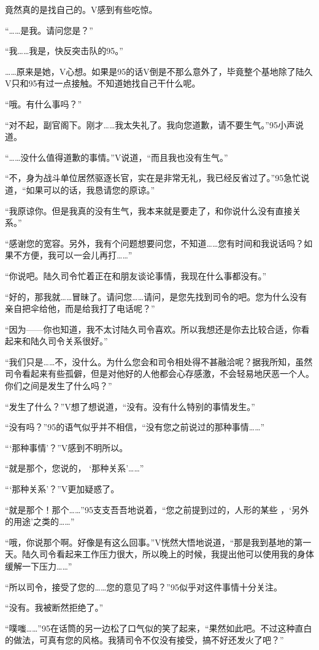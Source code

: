 竟然真的是找自己的。V感到有些吃惊。

“……是我。请问您是？”

“我……我是，快反突击队的95。”

……原来是她，V心想。如果是95的话V倒是不那么意外了，毕竟整个基地除了陆久V只和95有过一点接触。不知道她找自己干什么呢。

“哦。有什么事吗？”

“对不起，副官阁下。刚才……我太失礼了。我向您道歉，请不要生气。”95小声说道。

“……没什么值得道歉的事情。”V说道，“而且我也没有生气。”

“不，身为战斗单位居然驱逐长官，实在是非常无礼，我已经反省过了。”95急忙说道，“如果可以的话，我恳请您的原谅。”

“我原谅你。但是我真的没有生气，我本来就是要走了，和你说什么没有直接关系。”

“感谢您的宽容。另外，我有个问题想要问您，不知道……您有时间和我说话吗？如果不方便，我可以一会儿再打……”

“你说吧。陆久司令忙着正在和朋友谈论事情，我现在什么事都没有。”

“好的，那我就……冒昧了。请问您……请问，是您先找到司令的吧。您为什么没有亲自把伞给他，而是给我打了电话呢？”

“因为——你也知道，我不太讨陆久司令喜欢。所以我想还是你去比较合适，你看起来和陆久司令关系很好。”

“我们只是……不，没什么。为什么您会和司令相处得不甚融洽呢？据我所知，虽然司令看起来有些孤僻，但是对他好的人他都会心存感激，不会轻易地厌恶一个人。你们之间是发生了什么吗？”

“发生了什么？”V想了想说道，“没有。没有什么特别的事情发生。”

“没有吗？”95的语气似乎并不相信，“没有您之前说过的那种事情……”

“‘那种事情’？”V感到不明所以。

“就是那个，您说的， ‘那种关系’……”

“‘那种关系’？”V更加疑惑了。

“就是那个！那个……”95支支吾吾地说着，“您之前提到过的，人形的某些 ，‘另外的用途’之类的……”

“哦，你说那个啊。好像是有这么回事。”V恍然大悟地说道，“那是我到基地的第一天。陆久司令看起来工作压力很大，所以晚上的时候，我提出他可以使用我的身体缓解一下压力……”

“所以司令，接受了您的……您的意见了吗？”95似乎对这件事情十分关注。

“没有。我被断然拒绝了。”

“噗嗤……”95在话筒的另一边松了口气似的笑了起来，“果然如此吧。不过这种直白的做法，可真有您的风格。我猜司令不仅没有接受，搞不好还发火了吧？”

